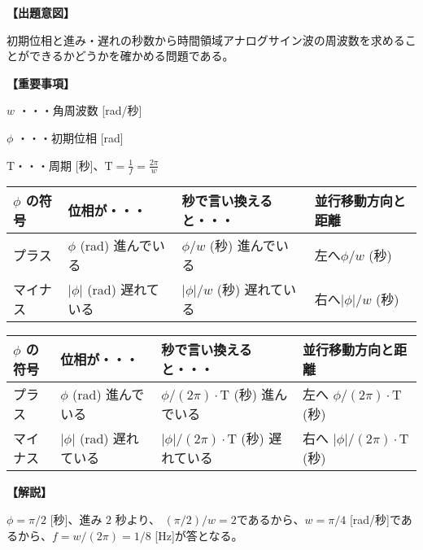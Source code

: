\noindent \textbf{【出題意図】}

\noindent 初期位相と進み・遅れの秒数から時間領域アナログサイン波の周波数を求めることができるかどうかを確かめる問題である。

\vspace{1em}
\noindent \textbf{【重要事項】}

\bigskip
\noindent $w$ ・・・角周波数 [rad/秒]

\bigskip
\noindent $\phi$ ・・・初期位相 [rad]

\bigskip
$\textrm{T}$・・・周期 [秒]、$\textrm{T} = \frac{1}{f} = \frac{2\pi}{w}$

\begin{center}
\begin{tabularx}{0.9\fbwidth}{|X|X|X|X|}
\hline
$\phi$ の符号&  位相が・・・   & 秒で言い換えると・・・   & 並行移動方向と距離 \\
\hline
プラス &  $\phi$ (rad) 進んでいる & $\phi/w$ (秒) 進んでいる & 左へ$\phi/w$ (秒) \\
\hline
マイナス &  $|\phi|$ (rad) 遅れている & $|\phi|/w$ (秒) 遅れている & 右へ$|\phi|/w$ (秒) \\
\hline
\end{tabularx}

\medskip
\begin{tabularx}{0.9\fbwidth}{|X|X|X|X|}
\hline
$\phi$ の符号&  位相が・・・   & 秒で言い換えると・・・   & 並行移動方向と距離 \\
\hline
プラス &  $\phi$ (rad) 進んでいる & $\phi/(2\pi) \cdot \textrm{T}$ (秒) 進んでいる & 左へ $\phi/(2\pi) \cdot \textrm{T}$ (秒) \\
\hline
マイナス &  $|\phi|$ (rad) 遅れている & $|\phi|/(2\pi) \cdot \textrm{T}$ (秒) 遅れている & 右へ $|\phi|/(2\pi) \cdot \textrm{T}$ (秒) \\
\hline
\end{tabularx}
\end{center}

\vspace{1em}
\noindent \textbf{【解説】}

\noindent $\phi = \pi/2$ [秒]、進み $2$ 秒より、 $(\pi/2)/w = 2$であるから、$w = \pi/4$ [rad/秒]であるから、$f = w/(2\pi) = 1/8$ [Hz]が答となる。
